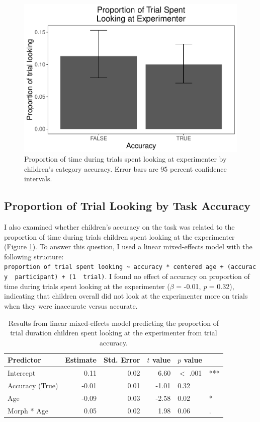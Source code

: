 \documentclass[,man,floatsintext]{apa6}
\begin{document}
\begin{figure}
\centering
\includegraphics{soc_ref_category_paper_files/figure-latex/accuracylooking-1.pdf}
\caption{\label{fig:accuracylooking}Proportion of time during trials spent looking at experimenter by children's category accuracy. Error bars are 95 percent confidence intervals.}
\end{figure}

\hypertarget{proportion-of-trial-looking-by-task-accuracy}{%
\subsection{Proportion of Trial Looking by Task Accuracy}\label{proportion-of-trial-looking-by-task-accuracy}}

I also examined whether children's accuracy on the task was related to the proportion of time during trials children spent looking at the experimenter (Figure \ref{fig:accuracylooking}). To answer this question, I used a linear mixed-effects model with the following structure: \texttt{proportion\ of\ trial\ spent\ looking\ \textasciitilde{}\ accuracy\ *\ centered\ age\ +\ (accuracy\ \textbar{}\ participant)\ +\ (1\ \textbar{}\ trial)}. I found no effect of accuracy on proportion of time during trials spent looking at the experimenter (\(\beta\) = -0.01, \emph{p} = 0.32), indicating that children overall did not look at the experimenter more on trials when they were inaccurate versus accurate.

\begin{table}[ht]
\centering
\caption{Results from linear mixed-effects model predicting the proportion of trial duration children spent looking at the experimenter from trial accuracy.} 
\begin{tabular}{lrrrll}
  \hline
Predictor & Estimate & Std. Error & $t$ value & $p$ value &   \\ 
  \hline
Intercept & 0.11 & 0.02 & 6.60 & $<$ .001 & *** \\ 
  Accuracy (True) & -0.01 & 0.01 & -1.01 & 0.32 &  \\ 
  Age & -0.09 & 0.03 & -2.58 & 0.02 & * \\ 
  Morph * Age & 0.05 & 0.02 & 1.98 & 0.06 & . \\ 
   \hline
\end{tabular}
\end{table}
\end{document}
